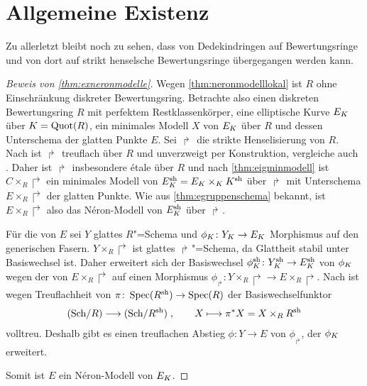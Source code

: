 \section{Allgemeine Existenz}\label{chap:exneronmodellebeweis}
Zu allerletzt bleibt noch zu sehen, dass von Dedekindringen
auf Bewertungsringe und von dort auf strikt henselsche Bewertungsringe
übergegangen werden kann.
\begin{proof}[Beweis von \ref{thm:exneronmodelle}]
  Wegen \ref{thm:neronmodelllokal} ist $R$ ohne Einschränkung
  diskreter Bewertungsring.
  Betrachte also einen diskreten Bewertungsring $R$ mit perfektem
  Restklassenkörper, eine elliptische Kurve $E_{K}$ über $K=\operatorname{Quot}(R)$,
  ein minimales Modell $X$ von $E_{K}$ über $R$ und dessen Unterschema
  der glatten Punkte $E$.
  Sei $\Rsh$ die strikte Henselisierung von $R$.
  Nach \cite[Chapter~2.4, Corollary~9]{neron} ist $\Rsh$ treuflach
  über $R$ und unverzweigt per Konstruktion, vergleiche auch
  \cite[Chapter~2.3, Proposition~11]{neron}.
  Daher ist $\Rsh$ insbesondere étale über $R$ und nach
  \ref{thm:eigminmodell} ist $C\times_R\Rsh$ ein minimales Modell von
  ${E_\Ksh=E_\K\times_\K\Ksh}$ über $\Rsh$ mit Unterschema
  $E\times_R\Rsh$ der glatten Punkte.
  Wie aus \ref{thm:egruppenschema} bekannt, ist $E\times_R\Rsh$ also
  das Néron-Modell von $E_\Ksh$ über $\Rsh$.

  Für die \NAbbEig von $E$ sei $Y$ glattes $R$"=Schema und
  ${\phi_{K}\colon Y_{K}\to E_{K}}$ Morphismus auf den generischen Fasern.
  $Y\times_R\Rsh$ ist glattes $\Rsh$"=Schema, da Glattheit stabil unter
  Basiswechsel ist. Daher erweitert sich der Basiswechsel
  ${\phi_\Ksh\colon Y_\Ksh\to E_\Ksh}$ von $\phi_{K}$ wegen der \NAbbEig
  von $E\times_R\Rsh$ auf einen Morphismus
  ${\phi_\Rsh\colon Y\times_R\Rsh\to E\times_R\Rsh}$.
  Nach \cite[Chapter~6.1, Theorem~6]{neron} ist wegen Treuflachheit
  von ${\pi\colon\operatorname{Spec}(R^{\text{sh}})\to\operatorname{Spec}(R)}$ der Basiswechselfunktor
  \begin{gather*}
    \text{(Sch/$R$)}\longto\text{(Sch/$\Rsh$)}\;,
    \qquad
    X\longmapsto \pi^*X=X\times_R\Rsh
  \end{gather*}
  volltreu. Deshalb gibt es einen treuflachen Abstieg
  ${\phi\colon Y\to E}$ von $\phi_\Rsh$, der $\phi_{K}$ erweitert.

  Somit ist $E$ ein Néron-Modell von $E_{K}$.
\end{proof}

